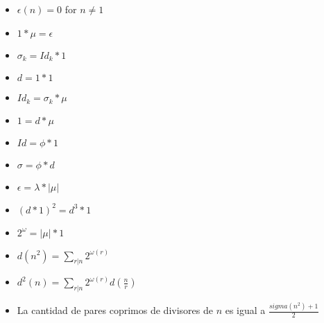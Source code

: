 {\normalsize
    \begin{itemize}
        \item $\epsilon(n) = 0$ for $n \neq 1$ 
        \item $1*\mu = \epsilon$
        \item $\sigma_k = Id_k*1$
        \item $d = 1 * 1$
        \item $Id_k = \sigma_k * \mu$
        \item $1 = d * \mu$
        \item $Id = \phi * 1$
        \item $\sigma = \phi * d$
        \item $\epsilon = \lambda*|\mu|$
        \item $(d*1)^2 = d^3*1$
        \item $2^\omega = |\mu|*1$
        \item $\displaystyle d(n^2) = \sum_{r|n} 2^{\omega(r)}$ 
        \item $\displaystyle d^2(n) = \sum_{r|n} 2^{\omega(r)}d(\frac{n}{r})$ 
        \item La cantidad de pares coprimos de divisores de $n$ es igual a $\frac{sigma(n^2)+1}{2}$
    \end{itemize} 
}

